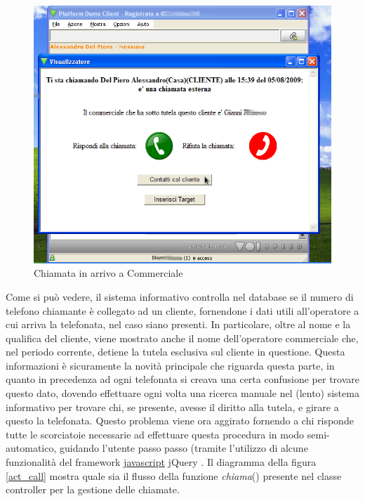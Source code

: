 \begin{figure}[!ht]
\centering
  \includegraphics[scale=0.8]{./images/chiamata_commerciale.png}
\caption{Chiamata in arrivo a Commerciale}
\label{chiamata_comm}
\end{figure}

\noindent
Come si pu\`o vedere, il sistema informativo controlla nel database se il numero di telefono chiamante \`e collegato ad un cliente, fornendone i dati utili all'operatore a cui arriva la telefonata, nel caso siano presenti. In particolare, oltre al nome e la qualifica del cliente, viene mostrato anche il nome dell'operatore commerciale che, nel periodo corrente, detiene la tutela esclusiva sul cliente in questione. Questa informazioni \`e sicuramente la novit\`a principale che riguarda questa parte, in quanto in precedenza ad ogni telefonata si creava una certa confusione per trovare questo dato, dovendo effettuare ogni volta una ricerca manuale nel (lento) sistema informativo per trovare chi, se presente, avesse il diritto alla tutela, e girare a questo la telefonata. Questo problema viene ora aggirato fornendo a chi risponde tutte le scorciatoie necessarie ad effettuare questa procedura in modo semi-automatico, guidando l'utente passo passo (tramite l'utilizzo di alcune funzionalit\`a del framework \hyperlink{javascript}{\underline{javascript}} jQuery \cite{jquery}. Il diagramma della figura \ref{act_call} mostra quale sia il flusso della funzione \textit{chiama}() presente nel classe controller per la gestione delle chiamate. 

